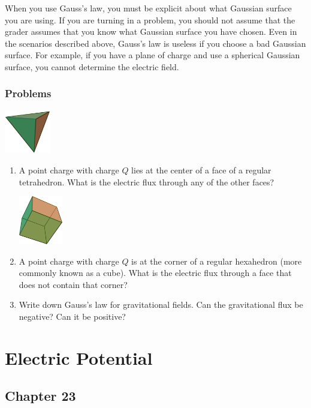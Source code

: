 \documentclass[12pt]{book}
\begin{document}
When you use Gauss's law, you must be explicit about what Gaussian surface you are using. If you are turning in a problem, you should not assume that the grader assumes that you know what Gaussian surface you have chosen. Even in the scenarios described above, Gauss's law is useless if you choose a bad Gaussian surface. For example, if you have a plane of charge and use a spherical Gaussian surface, you cannot determine the electric field.

\pagebreak

\subsection{Problems}

\begin{center}
\includegraphics[width=0.15\textwidth]{Tetrahedron.png}
\end{center}
\begin{enumerate}
 \item A point charge with charge $Q$ lies at the center of a face of a regular tetrahedron. What is the electric flux through any of the other faces?
 \begin{center}
\includegraphics[width=0.15\textwidth]{Hexahedron.png}
\end{center}
 \item A point charge with charge $Q$ is at the corner of a regular hexahedron (more commonly known as a cube). What is the electric flux through a face that does not contain that corner?
 \item Write down Gauss's law for gravitational fields. Can the gravitational flux be negative? Can it be positive?
\end{enumerate}


\chapter{Electric Potential}

\section{Chapter 23}
\end{document}
